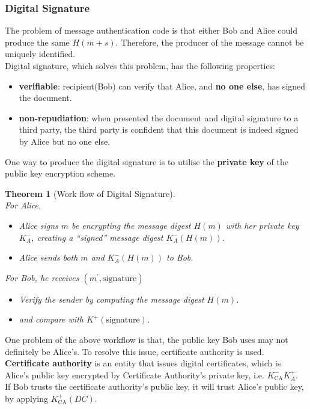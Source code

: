 \documentclass[12pt]{article}
\newtheorem{theorem}{Theorem}[section]
\theoremstyle{definition}
\begin{document}
\subsubsection{Digital Signature}
The problem of message authentication code is that either Bob and Alice could produce the same $H(m+s)$. Therefore, the producer of the message cannot be uniquely identified.\\
Digital signature, which solves this problem, has the following properties:
\begin{itemize}
  \item \textbf{verifiable}: recipient(Bob) can verify that Alice, and \textbf{no one else}, has signed the document.
  \item \textbf{non-repudiation}: when presented the document and digital signature to a third party, the third party is confident that this document is indeed signed by Alice but no one else.
\end{itemize}
One way to produce the digital signature is to utilise the \textbf{private key} of the public key encryption scheme.
\begin{theorem}[Work flow of Digital Signature]
\hfill\\\normalfont 
For Alice,
\begin{itemize}
\item Alice signs $m$ be encrypting the message digest $H(m)$ with her private key $K_A^-$, creating a ``signed'' message digest $K_A^-(H(m))$.
\item Alice sends both $m$ and $K_A^-(H(m))$ to Bob.
\end{itemize}
For Bob, he receives $(m^\prime, \text{signature})$
\begin{itemize}
  \item Verify the sender by computing the message digest $H(m)$.
  \item and compare with $K^+(\text{signature})$.
\end{itemize}
\end{theorem}
One problem of the above workflow is that, the public key Bob uses may not definitely be Alice's. To resolve this issue, certificate authority is used.\\\textbf{Certificate authority} is an entity that issues digital certificates, which is Alice's public key encrypted by Certificate Authority's private key, i.e. $K_\text{CA}^-K_A^+$.\\If Bob trusts the certificate authority's public key, it will trust Alice's public key, by applying $K_\text{CA}^+(DC)$.
\end{document}
